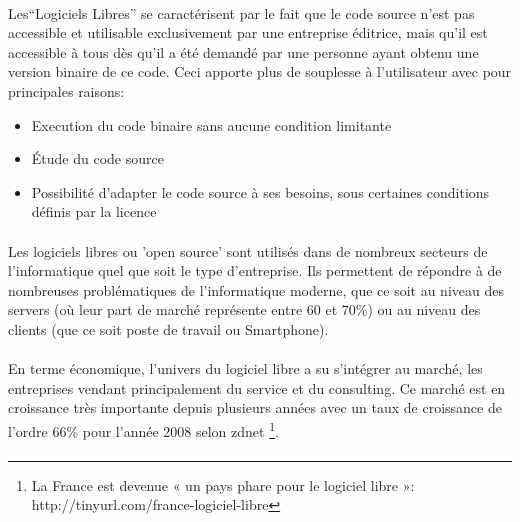 \paragraph{}

Les``Logiciels Libres'' se caractérisent par le fait
que le code source n'est pas accessible et utilisable exclusivement par
une entreprise éditrice, mais qu'il est accessible à tous dès qu'il a
été demandé par une personne ayant obtenu une version binaire de ce code.
Ceci apporte plus de souplesse à l'utilisateur avec pour principales raisons:

\begin{itemize}

  \item {Execution du code binaire sans aucune condition limitante}

  \item {Étude du code source}

  \item {Possibilité d'adapter le code source à ses besoins, sous
  certaines
    conditions définis par la licence}

\end{itemize}

\paragraph {}

Les logiciels libres ou 'open source' sont utilisés dans de nombreux
secteurs de l'informatique quel que soit le type d'entreprise. Ils
permettent de répondre à de nombreuses problématiques de l'informatique
moderne, que ce soit au niveau des servers (où leur part de marché
représente entre 60 et 70\%) ou au niveau des clients (que
ce soit poste de travail ou Smartphone).

\paragraph {}

En terme économique, l'univers du logiciel libre a su s'intégrer
au marché, les entreprises vendant principalement du service et du
consulting. Ce marché est en croissance très importante depuis plusieurs
années avec un taux de croissance de l'ordre 66\% pour l'année 2008
selon zdnet \footnote{La France est devenue « un pays phare pour le
logiciel libre »: http://tinyurl.com/france-logiciel-libre}.

\paragraph{}

